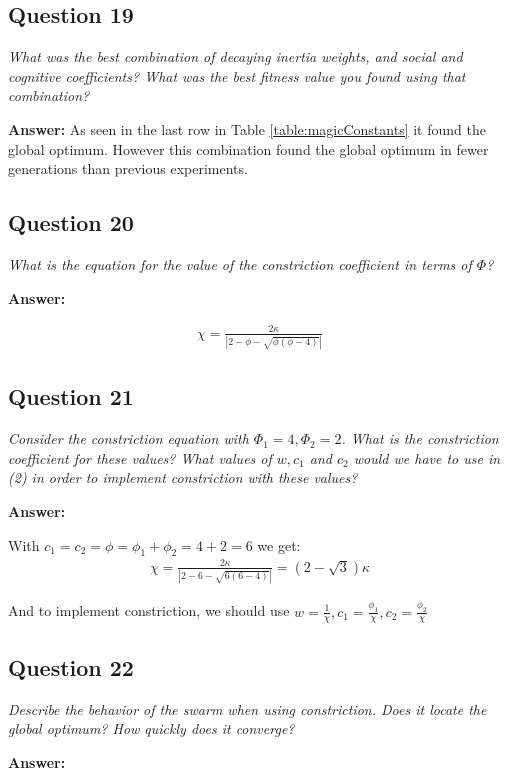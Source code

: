 \documentclass[a4paper]{article}
\begin{document}
\subsection*{Question 19}
\emph{What was the best combination of decaying inertia weights, and social and cognitive coefficients? What was the best fitness value you found using that combination?}

\textbf{Answer:} As seen in the last row in Table \ref{table:magicConstants} it found the global optimum. However this combination found the global optimum in fewer generations than previous experiments. 

\subsection*{Question 20}
\emph{What is the equation for the value of the constriction coefficient
in terms of $\Phi$?}

\textbf{Answer:}

\begin{align*}
\chi = \frac{2\kappa}{|2-\phi-\sqrt{\phi(\phi-4)}|}
\end{align*}


\subsection*{Question 21}
\emph{Consider the constriction equation with $\Phi_1 = 4, \Phi_2 = 2$. What is the constriction coefficient for these values? What values of $w, c_1$ and $c_2$ would we have to use in (2) in order to implement constriction with these values?}

\textbf{Answer:}

With $c_1 = c_2 = \phi = \phi_1 + \phi_2 = 4 + 2 = 6$ we get:
\begin{align*}
\chi = \frac{2\kappa}{|2-6-\sqrt{6(6-4)}|} = (2-\sqrt{3})\kappa
\end{align*}

And to implement constriction, we should use $w = \frac{1}{\chi}, c_1 = \frac{\phi_1}{\chi}, c_2 = \frac{\phi_2}{\chi}$

\subsection*{Question 22}
\emph{Describe the behavior of the swarm when using constriction.
Does it locate the global optimum? How quickly does it converge?}

\textbf{Answer:}
\end{document}
